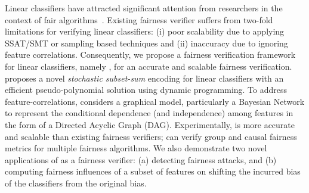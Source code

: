 Linear classifiers have attracted significant attention from researchers in the context of fair algorithms~\cite{pleiss2017fairness,zafar2017fairness,dressel2018accuracy, john2020verifying}. Existing fairness verifier suffers from two-fold limitations for verifying linear classifiers: (i) poor scalability due to applying SSAT/SMT or sampling based techniques and (ii) inaccuracy due to ignoring feature correlations. Consequently, we propose a fairness verification framework for linear classifiers, namely {\fvgm}, for an accurate and scalable fairness verification. {\fvgm} proposes a novel \textit{stochastic subset-sum} encoding for linear classifiers with an efficient pseudo-polynomial solution using dynamic programming. To address feature-correlations, {\fvgm} considers a graphical model, particularly a Bayesian Network to represent the conditional dependence (and independence) among features in the form of a Directed Acyclic Graph (DAG). Experimentally,  {\fvgm} is more accurate and scalable than existing fairness verifiers; {\fvgm} can verify group and causal fairness metrics for multiple fairness algorithms. We also demonstrate two novel applications of {\fvgm} as a fairness verifier: (a) detecting fairness attacks, and (b) computing fairness influences of a subset of features on shifting the incurred bias of the classifiers from the original bias.






